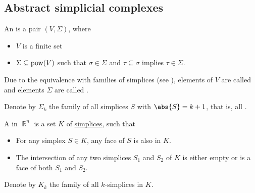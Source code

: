 \subsection{Abstract simplicial complexes}\label{subsec:abstract_simplicial_complexes}

\begin{definition}\label{def:abstract_simplicial_complex}\mcite\cite[def. 2.1]{Carlsson2009}
  An  is a pair \( (V, \Sigma) \), where
  \begin{itemize}
    \item \( V \) is a finite set
    \item \( \Sigma \subseteq \operatorname{pow}(V) \) such that \( \sigma \in \Sigma \) and \( \tau \subseteq \sigma \) implies \( \tau \in \Sigma \).
  \end{itemize}

  Due to the equivalence with families of simplices (see ), elements of \( V \) are called  and elements \( \Sigma \) are called .

  Denote by \( \Sigma_k \) the family of all simplices \( S \) with \( \abs{S} = k + 1 \), that is, all .
\end{definition}

\begin{definition}\label{def:simplicial_complex}
  A  in \( \BbbR^n \) is a set \( K \) of \hyperref[def:simplex]{simplices}, such that
  \begin{itemize}
    \item For any simplex \( S \in K \), any face of \( S \) is also in \( K \).
    \item The intersection of any two simplices \( S_1 \) and \( S_2 \) of \( K \) is either empty or is a face of both \( S_1 \) and \( S_2 \).
  \end{itemize}

  Denote by \( K_k \) the family of all \( k \)-simplices in \( K \).
\end{definition}

